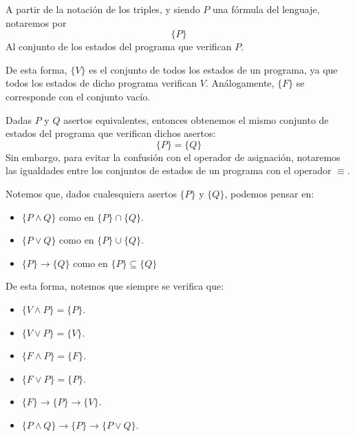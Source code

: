 \begin{notacion}
    A partir de la notación de los triples, y siendo $P$ una fórmula del lenguaje, notaremos por
    \begin{equation*}
        \{P\}
    \end{equation*}
    Al conjunto de los estados del programa que verifican $P$.
\end{notacion}

De esta forma, $\{V\}$ es el conjunto de todos los estados de un programa, ya que todos los estados de dicho programa verifican $V$. Análogamente, $\{F\}$ se corresponde con el conjunto vacío.

\begin{notacion}
    Dadas $P$ y $Q$ asertos equivalentes, entonces obtenemos el mismo conjunto de estados del programa que verifican dichos asertos:
    \begin{equation*}
        \{P\} = \{Q\}
    \end{equation*}
    Sin embargo, para evitar la confusión con el operador de asignación, notaremos las igualdades entre los conjuntos de estados de un programa con el operador $\equiv$.
\end{notacion}

\begin{observacion}
    Notemos que, dados cualesquiera asertos $\{P\}$ y $\{Q\}$, podemos pensar en:
    \begin{itemize}
        \item $\{P \land Q\}$ como en  $\{P\} \cap \{Q\}$.
        \item $\{P \lor Q\}$ como en $\{P\} \cup \{Q\}$.
        \item $\{P\} \rightarrow \{Q\}$ como en $\{P\} \subseteq \{Q\}$
    \end{itemize}
    De esta forma, notemos que siempre se verifica que:
    \begin{itemize}
        \item $\{V \land P\} = \{P\}$.
        \item $\{V \lor P\} = \{V\}$.
        \item $\{F \land P\} = \{F\}$.
        \item $\{F \lor P\} = \{P\}$.
        \item $\{F\}\rightarrow \{P\} \rightarrow \{V\}$.
        \item $\{P \land Q\}\rightarrow \{P\} \rightarrow\{P \lor Q\}$.
    \end{itemize}
\end{observacion}

